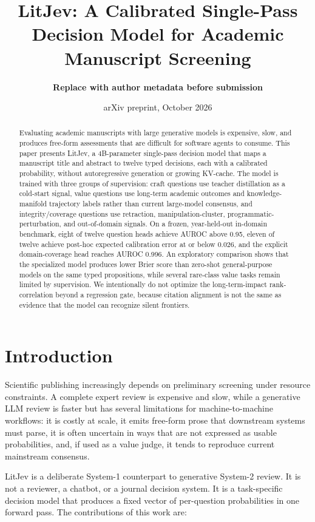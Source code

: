 \documentclass[11pt]{article}
\title{LitJev: A Calibrated Single-Pass Decision Model for Academic Manuscript Screening}
\author{\textbf{Replace with author metadata before submission}}
\date{arXiv preprint, October 2026}
\begin{document}
\maketitle

\begin{abstract}
Evaluating academic manuscripts with large generative models is expensive,
slow, and produces free-form assessments that are difficult for software
agents to consume. This paper presents LitJev, a 4B-parameter single-pass
decision model that maps a manuscript title and abstract to twelve typed
decisions, each with a calibrated probability, without autoregressive
generation or growing KV-cache. The model is trained with three groups of
supervision: craft questions use teacher distillation as a cold-start signal,
value questions use long-term academic outcomes and knowledge-manifold
trajectory labels rather than current large-model consensus, and
integrity/coverage questions use retraction, manipulation-cluster,
programmatic-perturbation, and out-of-domain signals. On a frozen,
year-held-out in-domain benchmark, eight of twelve question heads achieve AUROC
above 0.95, eleven of twelve achieve post-hoc expected calibration error at or
below 0.026, and the explicit domain-coverage head reaches AUROC 0.996. An
exploratory comparison shows that the specialized model produces lower Brier
score than zero-shot general-purpose models on the same typed propositions,
while several rare-class value tasks remain limited by supervision. We
intentionally do not optimize the long-term-impact rank-correlation beyond a
regression gate, because citation alignment is not the same as evidence that
the model can recognize silent frontiers.
\end{abstract}

\section{Introduction}

Scientific publishing increasingly depends on preliminary screening under
resource constraints. A complete expert review is expensive and slow, while a
generative LLM review is faster but has several limitations for
machine-to-machine workflows: it is costly at scale, it emits free-form prose
that downstream systems must parse, it is often uncertain in ways that are not
expressed as usable probabilities, and, if used as a value judge, it tends to
reproduce current mainstream consensus.

LitJev is a deliberate System-1 counterpart to generative System-2 review. It
is not a reviewer, a chatbot, or a journal decision system. It is a
task-specific decision model that produces a fixed vector of per-question
probabilities in one forward pass. The contributions of this work are:
\end{document}
